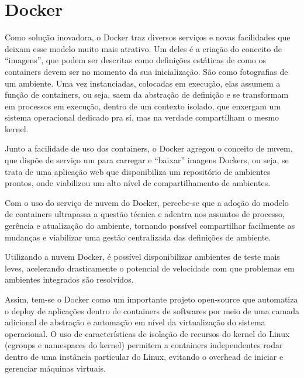 \section{Docker}
Como solução inovadora, o Docker traz diversos serviços e novas 
facilidades que deixam esse modelo muito mais atrativo. Um deles 
é a criação do conceito de “imagens”, que podem ser descritas como 
definições estáticas de como os containers devem ser no momento da 
sua inicialização. São como fotografias de um ambiente. Uma vez 
instanciadas, colocadas em execução, elas assumem a função de 
containers, ou seja, saem da abstração de definição e se transformam 
em processos em execução, dentro de um contexto isolado, que 
enxergam um sistema operacional dedicado pra sí, mas na verdade 
compartilham o mesmo kernel.

Junto a facilidade de uso dos containers, o Docker agregou o 
conceito de nuvem, que dispõe de serviço um para carregar e 
“baixar” imagens Dockers, ou seja, se trata de uma aplicação 
web que disponibiliza um repositório de ambientes prontos, 
onde viabilizou um alto nível de compartilhamento de ambientes.

Com o uso do serviço de nuvem do Docker, percebe-se que a 
adoção do modelo de containers ultrapassa a questão técnica 
e adentra nos assuntos de processo, gerência e atualização 
do ambiente, tornando possível compartilhar facilmente as 
mudanças e viabilizar uma gestão centralizada das definições 
de ambiente.

Utilizando a nuvem Docker, é possível disponibilizar ambientes de 
teste mais leves, acelerando drasticamente o potencial de velocidade 
com que problemas em ambientes integrados são resolvidos.

Assim, tem-se o Docker como um importante projeto open-source 
que automatiza o deploy de aplicações dentro de containers de 
softwares por meio de uma camada adicional de abstração e automação 
em nível da virtualização do sistema operacional. O uso de 
características de isolação de recursos do kernel do Linux 
(cgroups e namespaces do kernel) permitem a containers 
independentes rodar dentro de uma instância particular do Linux, 
evitando o overhead de iniciar e gerenciar máquinas virtuais.
